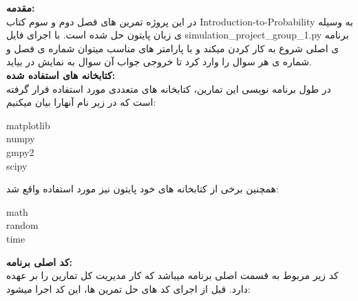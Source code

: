 \documentclass[a4paper,14pt]{article}
\begin{document}
	\newpage
	
	
	\textbf{مقدمه:}\\
	
	در این پروژه تمرین های فصل دوم و سوم کتاب Introduction-to-Probability به وسیله ی زبان پایتون حل شده است. با اجرای فایل simulation\_project\_group\_1.py برنامه ی اصلی شروع به کار کردن میکند و با پارامتر های مناسب میتوان شماره ی فصل و شماره ی هر سوال را وارد کرد تا خروجی جواب آن سوال به نمایش در بیاید.\\
	
	\textbf{کتابخانه های استفاده شده:}\\
	
	در طول برنامه نویسی این تمارین، کتابخانه های متعددی مورد استفاده قرار گرفته است که در زیر نام آنهارا بیان میکنیم:\\
	
	
	\begin{latin}
		matplotlib\\
		numpy\\
		gmpy2\\
		scipy\\
	\end{latin}

همچنین برخی از کتابخانه های خود پایتون نیز مورد استفاده واقع شد:\\

	\begin{latin}
		math\\
		random\\
		time\\
	\end{latin}
	
	
	\textbf{کد اصلی برنامه:}\\
	
	کد زیر مربوط به قسمت اصلی برنامه میباشد که کار مدیریت کل تمارین را بر عهده دارد. قبل از اجرای کد های حل تمرین ها، این کد اجرا میشود:\\
	
\fontsize{11}{11}\selectfont
\end{document}
